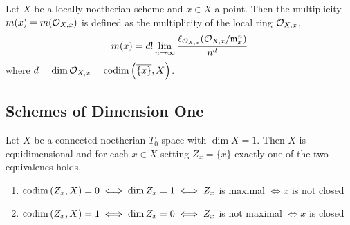 \documentclass[12pt]{article}
\begin{document}
\begin{defn}
Let $X$ be a locally noetherian scheme and $x \in X$ a point. Then the multiplicity $m(x) = m(\mathcal{O}_{X, x})$ is defined as the multiplicity of the local ring $\mathcal{O}_{X, x}$,
\[ m(x) = d! \lim_{n \to \infty} \frac{\ell_{\mathcal{O}_{X, x}}(\mathcal{O}_{X, x} / \mathfrak{m}_x^n)}{n^{d}} \]
where $d = \dim{\mathcal{O}_{X, x}} = \mathrm{codim}\left( \overline{ \{ x \} }, X \right)$. 
\end{defn}


\subsection{Schemes of Dimension One}

\begin{prop}
Let $X$ be a connected noetherian $T_0$ space with $\dim{X} = 1$. Then $X$ is equidimensional and for each $x \in X$ setting $Z_x = \overline{ \{ x \} }$ exactly one of the two equivalenes holds,
\begin{enumerate}
\item $\mathrm{codim}\left( Z_x, X \right) = 0 \iff \dim{Z_x} = 1 \iff Z_x$ is maximal $\iff x $ is not closed
\item $\mathrm{codim}\left( Z_x, X \right) = 1 \iff \dim{Z_x} = 0 \iff Z_x$ is not maximal $\iff x$ is closed
\end{enumerate}
\end{prop}
\end{document}

